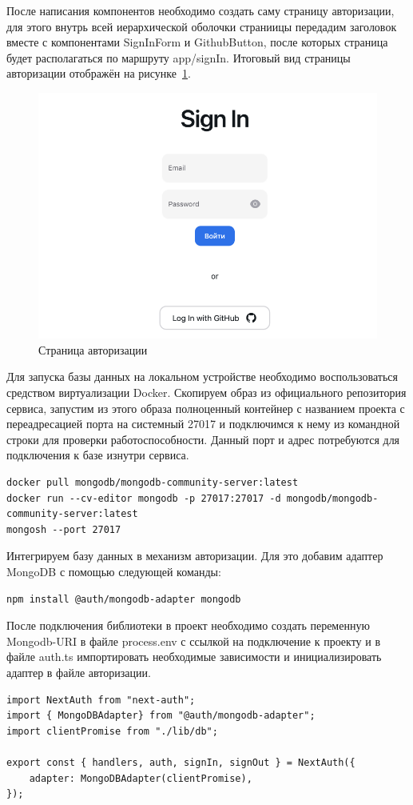 \documentclass[master, och, diploma]{SCWorks}
\begin{document}
После написания компонентов необходимо создать саму страницу авторизации, для этого внутрь всей иерархической оболочки страниицы передадим заголовок вместе с компонентами SignInForm и GithubButton, после которых страница будет располагаться по маршруту app/signIn. Итоговый вид страницы авторизации отображён на рисунке~\ref{fig:27}. 
\begin{figure}[!ht]
    \centering
    \includegraphics[width=12cm]{images/image-signin.png}
    \caption{\label{fig:27}%
        Страница авторизации}
\end{figure}

Для запуска базы данных на локальном устройстве необходимо воспользоваться средством виртуализации Docker. Скопируем образ из официального репозитория сервиса, запустим из этого образа полноценный контейнер с названием проекта с переадресацией порта на системный 27017 и подключимся к нему из командной строки для проверки работоспособности. Данный порт и адрес потребуются для подключения к базе изнутри сервиса.
\begin{verbatim}
docker pull mongodb/mongodb-community-server:latest
docker run --cv-editor mongodb -p 27017:27017 -d mongodb/mongodb-community-server:latest
mongosh --port 27017
\end{verbatim}

Интегрируем базу данных в механизм авторизации. Для это добавим адаптер MongoDB с помощью следующей команды:
\begin{verbatim}
npm install @auth/mongodb-adapter mongodb
\end{verbatim}

После подключения библиотеки в проект необходимо создать переменную Mongodb-URI в файле process.env с ссылкой на подключение к проекту и в файле auth.ts импортировать необходимые зависимости и инициализировать адаптер в файле авторизации.
\begin{verbatim}
import NextAuth from "next-auth";
import { MongoDBAdapter} from "@auth/mongodb-adapter";
import clientPromise from "./lib/db";

export const { handlers, auth, signIn, signOut } = NextAuth({
    adapter: MongoDBAdapter(clientPromise),
});
\end{verbatim}
\end{document}
